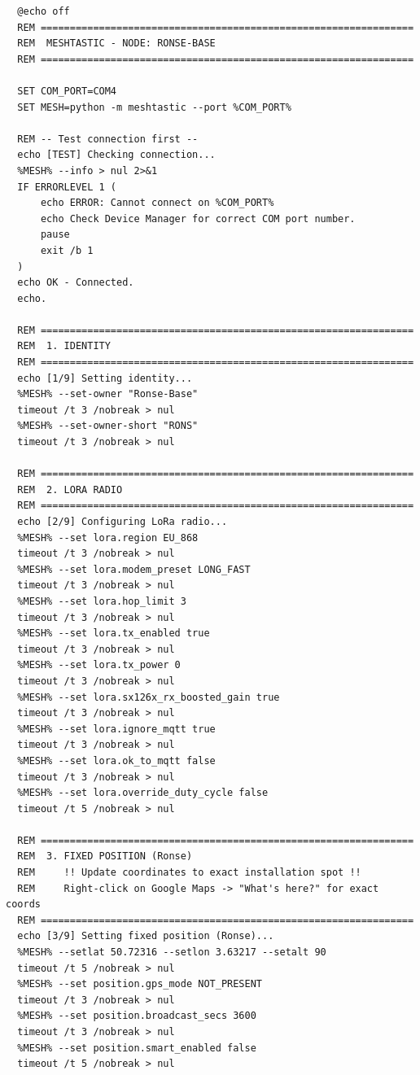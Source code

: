 \begin{verbatim}
  @echo off
  REM ================================================================
  REM  MESHTASTIC - NODE: RONSE-BASE
  REM ================================================================

  SET COM_PORT=COM4
  SET MESH=python -m meshtastic --port %COM_PORT%

  REM -- Test connection first --
  echo [TEST] Checking connection...
  %MESH% --info > nul 2>&1
  IF ERRORLEVEL 1 (
      echo ERROR: Cannot connect on %COM_PORT%
      echo Check Device Manager for correct COM port number.
      pause
      exit /b 1
  )
  echo OK - Connected.
  echo.

  REM ================================================================
  REM  1. IDENTITY
  REM ================================================================
  echo [1/9] Setting identity...
  %MESH% --set-owner "Ronse-Base"
  timeout /t 3 /nobreak > nul
  %MESH% --set-owner-short "RONS"
  timeout /t 3 /nobreak > nul

  REM ================================================================
  REM  2. LORA RADIO
  REM ================================================================
  echo [2/9] Configuring LoRa radio...
  %MESH% --set lora.region EU_868
  timeout /t 3 /nobreak > nul
  %MESH% --set lora.modem_preset LONG_FAST
  timeout /t 3 /nobreak > nul
  %MESH% --set lora.hop_limit 3
  timeout /t 3 /nobreak > nul
  %MESH% --set lora.tx_enabled true
  timeout /t 3 /nobreak > nul
  %MESH% --set lora.tx_power 0
  timeout /t 3 /nobreak > nul
  %MESH% --set lora.sx126x_rx_boosted_gain true
  timeout /t 3 /nobreak > nul
  %MESH% --set lora.ignore_mqtt true
  timeout /t 3 /nobreak > nul
  %MESH% --set lora.ok_to_mqtt false
  timeout /t 3 /nobreak > nul
  %MESH% --set lora.override_duty_cycle false
  timeout /t 5 /nobreak > nul

  REM ================================================================
  REM  3. FIXED POSITION (Ronse)
  REM     !! Update coordinates to exact installation spot !!
  REM     Right-click on Google Maps -> "What's here?" for exact coords
  REM ================================================================
  echo [3/9] Setting fixed position (Ronse)...
  %MESH% --setlat 50.72316 --setlon 3.63217 --setalt 90
  timeout /t 5 /nobreak > nul
  %MESH% --set position.gps_mode NOT_PRESENT
  timeout /t 3 /nobreak > nul
  %MESH% --set position.broadcast_secs 3600
  timeout /t 3 /nobreak > nul
  %MESH% --set position.smart_enabled false
  timeout /t 5 /nobreak > nul


\end{verbatim}
